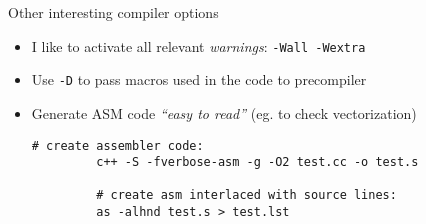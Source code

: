 \documentclass[10pt,xcolor=table]{beamer}
\begin{document}
\begin{frame}[fragile]{Other interesting compiler options}

  \begin{itemize}
  \item I like to activate all relevant \emph{warnings}: {\tt -Wall
      -Wextra}
  \item Use {\tt -D} to pass macros used in the code to precompiler

    \pause

  \item Generate ASM code \emph{``easy to read''} (eg. to check
    vectorization)
        \begin{lstlisting}[style=shell,gobble=5,caption={From the book
\emph{Algorithms for programmers}\footnote<2>{Algorithm for programmers:
\url{https://www.jjj.de/fxt/fxtbook.pdf}}\footnote<2>{Generating Mixed
Source and Assembly List using GCC: {\scriptsize \url{http://www.systutorials.com/240/generate-a-mixed-source-and-assembly-listing-using-gcc}}}}]
         # create assembler code:
         c++ -S -fverbose-asm -g -O2 test.cc -o test.s

         # create asm interlaced with source lines:
         as -alhnd test.s > test.lst
       \end{lstlisting}
  \end{itemize}

\end{frame}

\end{document}
